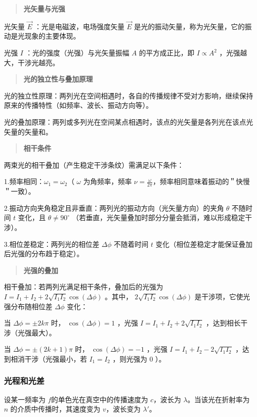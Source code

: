 \documentclass[withoutpreface,bwprint]{cumcmthesis} %
\begin{document}
\begin{quote}
    \textbf{光矢量与光强}
\end{quote}

光矢量 $\vec{E}$ ：光是电磁波，电场强度矢量 $\vec{E}$ 是光的振动矢量，称为光矢量，它的振动是光现象的主要体现。

光强 $I$ ：光的强度（光强）与光矢量振幅 $A$ 的平方成正比，即 $I \propto A^2$ ，光强越大，干涉光越亮。

\begin{quote}
    \textbf{光的独立性与叠加原理}
\end{quote}


光的独立性原理：两列光在空间相遇时，各自的传播规律不受对方影响，继续保持原来的传播特性（如频率、波长、振动方向等）。

光的叠加原理：两列或多列光在空间某点相遇时，该点的光矢量是各列光在该点光矢量的矢量和。


\begin{quote}
    \textbf{相干条件}
\end{quote}
两束光的相干叠加（产生稳定干涉条纹）需满足以下条件：

1.频率相同：\(\omega_{1} = \omega_{2}\)（ $\omega$ 为角频率，频率 $\nu= \frac{\omega}{2\pi}$，频率相同意味着振动的＂快慢＂一致）。

2.振动方向夹角稳定且非垂直：两列光的振动方向（光矢量方向）的夹角 $\theta$ 不随时间 $t$ 变化，且 $\theta \neq 90^\circ$ （若垂直，光矢量叠加时部分分量会抵消，难以形成稳定干涉）。

3.相位差稳定：两列光的相位差 $\Delta \phi$ 不随着时间 $t$ 变化（相位差稳定才能保证叠加后光强的分布趋于稳定）。

\begin{quote}
    \textbf{光强的叠加}
\end{quote}

相干叠加：若两列光满足相干条件，叠加后的光强为 $I = I_1 + I_2 + 2 \sqrt{I_1 I_2} \cos(\Delta \phi)$ 。其中， $2 \sqrt{I_1 I_2} \cos(\Delta \phi)$ 是干涉项，它使光强分布随相位差 $\Delta \phi$ 变化：

当 $\Delta \phi = \pm 2k\pi$ 时， $\cos(\Delta \phi) = 1$ ，光强 $I = I_1 + I_2 + 2 \sqrt{I_1 I_2}$ ，达到相长干涉（光强最大）。

当 $\Delta \phi = \pm (2k+1)\pi$ 时， $\cos(\Delta \phi) = -1$ ，光强 $I = I_1 + I_2 - 2 \sqrt{I_1 I_2}$ ，达到相消干涉（光强最小，若 $I_1 = I_2$ ，则光强为 $0$ ）。

\subsubsection{光程和光差}
设某一频率为 $f$的单色光在真空中的传播速度为 $c$，波长为 $\lambda$。当该光在折射率为 $n$ 的介质中传播时，其速度变为 $v$，波长变为 $\lambda'$。
\end{document}
